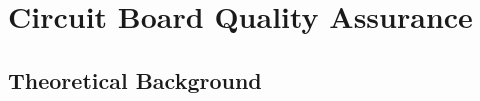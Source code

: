 \documentclass[a4paper,12pt]{article}
\begin{document}


\newpage

\section{Circuit Board Quality Assurance}

\subsection{Theoretical Background}


\end{document}
